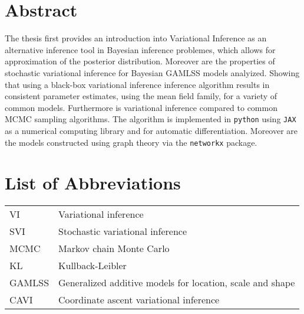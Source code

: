 
\section*{Abstract}

The thesis first provides an introduction into Variational Inference as an alternative
inference tool in Bayesian inference problemes, which allows for approximation of the posterior distribution.
Moreover are the properties of stochastic variational inference for Bayesian GAMLSS models analyized.
Showing that using a black-box variational inference inference algorithm results in
consistent parameter estimates, using the mean field family, for a variety of common models.
Furthermore is variational inference compared to common MCMC sampling algorithms. The algorithm is implemented in \verb|python|
using \verb|JAX| as a numerical computing library and for automatic differentiation.
Moreover are the models constructed using graph theory via the \verb|networkx| package.

\clearpage

\tableofcontents
\clearpage

\listoffigures

\listoftables

\section*{List of Abbreviations}

\begin{tabular}{@{} l @{\hskip 1in} l}
  VI & Variational inference \\
  SVI & Stochastic variational inference \\
  MCMC & Markov chain Monte Carlo \\
  KL & Kullback-Leibler \\
  GAMLSS & Generalized additive models for location, scale and shape \\
  CAVI & Coordinate ascent variational inference \\
\end{tabular}
